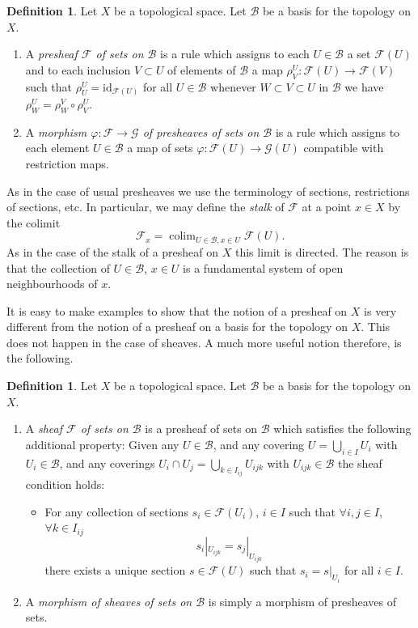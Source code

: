 \documentclass{stacks-project}
\theoremstyle{plain}
\theoremstyle{definition}
\newtheorem{definition}[subsection]{Definition}
\theoremstyle{remark}
\numberwithin{equation}{subsection}
\def\colim{\mathop{\mathrm{colim}}\nolimits}
\begin{document}
\begin{definition}
\label{definition-presheaf-basis}
Let $X$ be a topological space. Let $\mathcal{B}$ be a
basis for the topology on $X$.
\begin{enumerate}
\item A {\it presheaf $\mathcal{F}$ of sets on $\mathcal{B}$}
is a rule which assigns to each $U \in \mathcal{B}$ a set
$\mathcal{F}(U)$ and to each inclusion $V \subset U$
of elements of $\mathcal{B}$ a map
$\rho^U_V : \mathcal{F}(U) \to \mathcal{F}(V)$ such that
$\rho^U_U = \text{id}_{\mathcal{F}(U)}$ for all $U \in \mathcal{B}$
whenever $W \subset V \subset U$ in $\mathcal{B}$ we have
$\rho^U_W = \rho^V_W \circ \rho ^U_V$.
\item A {\it morphism $\varphi : \mathcal{F} \to \mathcal{G}$
of presheaves of sets on $\mathcal{B}$} is a rule which assigns to each
element $U \in \mathcal{B}$ a map of sets $\varphi : \mathcal{F}(U)
\to \mathcal{G}(U)$ compatible with restriction maps.
\end{enumerate}
\end{definition}

\noindent
As in the case of usual presheaves we use the terminology of sections,
restrictions of sections, etc. In particular, we may define the
{\it stalk} of $\mathcal{F}$ at a point $x \in X$ by the
colimit
$$
\mathcal{F}_x = \colim_{U\in \mathcal{B}, x\in U} \mathcal{F}(U).
$$
As in the case of the stalk of a presheaf on $X$ this limit is
directed. The reason is that the collection of $U\in \mathcal{B}$,
$x \in U$ is a fundamental system of open neighbourhoods of $x$.

\medskip\noindent
It is easy to make examples to show that the notion of a presheaf
on $X$ is very different from the notion of a presheaf on a basis
for the topology on $X$. This does not happen in the case of
sheaves. A much more useful notion therefore, is the following.

\begin{definition}
\label{definition-sheaf-basis}
Let $X$ be a topological space. Let $\mathcal{B}$ be a
basis for the topology on $X$.
\begin{enumerate}
\item A {\it sheaf $\mathcal{F}$ of sets on $\mathcal{B}$} is a presheaf
of sets on $\mathcal{B}$ which satisfies the following additional
property: Given any $U \in \mathcal{B}$, and any covering
$U = \bigcup_{i \in I} U_i$ with $U_i \in \mathcal{B}$, and
any coverings $U_i \cap U_j = \bigcup_{k \in I_{ij}} U_{ijk}$ with
$U_{ijk} \in \mathcal{B}$ the sheaf condition holds:
\begin{itemize}
\item[(**)] For any collection
of sections $s_i \in \mathcal{F}(U_i)$, $i \in I$ such that
$\forall i, j\in I$, $\forall k\in I_{ij}$
$$
s_i|_{U_{ijk}} = s_j|_{U_{ijk}}
$$
there exists a unique section $s \in \mathcal{F}(U)$ such that
$s_i = s|_{U_i}$ for all $i \in I$.
\end{itemize}
\item A {\it morphism of sheaves of sets on $\mathcal{B}$} is simply a
morphism of presheaves of sets.
\end{enumerate}
\end{definition}
\end{document}
